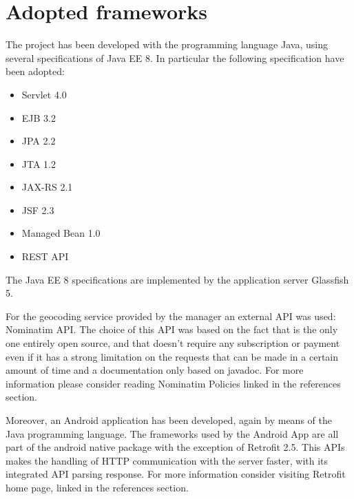 
\section{Adopted frameworks}

The project has been developed with the programming language Java, using several specifications of Java EE 8.
In particular the following specification have been adopted:

\begin{itemize}
\item Servlet 4.0
\item EJB 3.2
\item JPA 2.2
\item JTA 1.2
\item JAX-RS 2.1
\item JSF 2.3
\item Managed Bean 1.0
\item REST API
\end{itemize}
The Java EE 8 specifications are implemented by the application server Glassfish 5.
\vspace{1em}

\noindent
For the geocoding service provided by the manager an external API was used: Nominatim API. 
The choice of this API was based on the fact that is the only one entirely open source, and that doesn't require any subscription or payment even if it has a strong limitation on the requests that can be made in a certain amount of time and a documentation only based on javadoc.
For more information please consider reading Nominatim Policies linked in the references section.
\vspace{1em}

\noindent
Moreover, an Android application has been developed, again by means of the Java programming language.
The frameworks used by the Android App are all part of the android native package with the exception of Retrofit 2.5. This APIs makes the handling of HTTP communication with the server faster, with its integrated API parsing response. 
For more information consider visiting Retrofit home page, linked in the references section.
